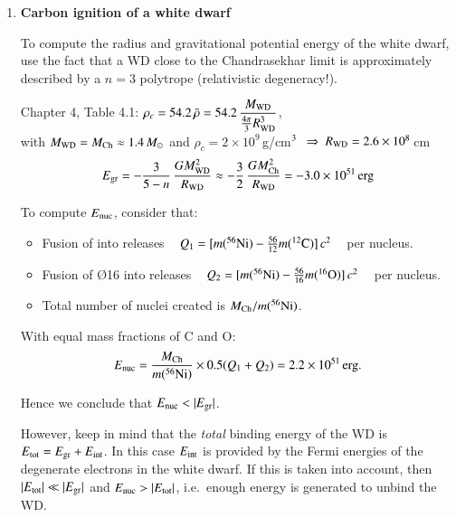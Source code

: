 \documentclass[11pt,a4paper,fleqn]{report}
\begin{document}
\begin{enumerate}
\begin{enumerate}
\end{enumerate} 


\item {\bf Carbon ignition of a white dwarf}

  To compute the radius and gravitational potential energy of the
  white dwarf, use the fact that a WD close to the Chandrasekhar limit
  is approximately described by a $n=3$ polytrope (relativistic
  degeneracy!). 

  Chapter 4, Table 4.1: \quad $\rho_c = 54.2\, \bar{\rho} = 54.2\,
  \displaystyle \frac{M_{\rm WD}}{\frac{4\pi}{3}R_{\rm WD}^3}$, \\[1ex]
  with $M_{\rm WD} = M_\mathrm{Ch} \approx 1.4\,\Msun$ and $\rho_c =
  2\times10^9$\,g/cm$^3~~\Rightarrow~ R_{\rm WD} = 2.6\times10^8$\,cm
  \[
  E_{\rm gr} = -\frac{3}{5-n}\,\frac{G M_{\rm WD}^2}{R_\mathrm{WD}}
  \approx -\frac{3}{2}\,\frac{G M_{\rm Ch}^2}{R_\mathrm{WD}}
  = -3.0\times 10^{51}\,{\rm erg} 
  \]
  
  To compute $E_{\rm nuc}$, consider that:
  \begin{itemize}
  \item
    Fusion of  into  releases ~ $Q_1 = [m(\el{Ni}{56}) -
    \frac{56}{12}m(\C{12})]\,c^2$ ~ per  nucleus.
  \item
    Fusion of \O{16} into  releases ~ $Q_2 = [m(\el{Ni}{56}) -
    \frac{56}{16}m(\O{16})]\,c^2$ ~ per  nucleus.
  \item
    Total number of  nuclei created is 
    $M_\mathrm{Ch}/m(\el{Ni}{56})$.
  \end{itemize}
  With equal mass fractions of C and O:
  \[
  E_{\rm nuc} = \frac{M_\mathrm{Ch}}{m(\el{Ni}{56})}\times 0.5 (Q_1 + Q_2) 
  = 2.2\times 10^{51}\,\mathrm{erg}.
  \]

  Hence we conclude that $E_{\rm nuc} < |E_{\rm gr}|$. 

  However, keep in mind that the \emph{total} binding energy of the WD
  is $E_{\rm tot} = E_{\rm gr} + E_{\rm int}$. In this case $E_{\rm
    int}$ is provided by the Fermi energies of the degenerate
  electrons in the white dwarf. If this is taken into account, then
  $|E_{\rm tot}| \ll |E_{\rm gr}|$ and $E_{\rm nuc} > |E_{\rm tot}|$,
  i.e.\ enough energy is generated to unbind the WD.

  
\end{enumerate} 
\end{document}
